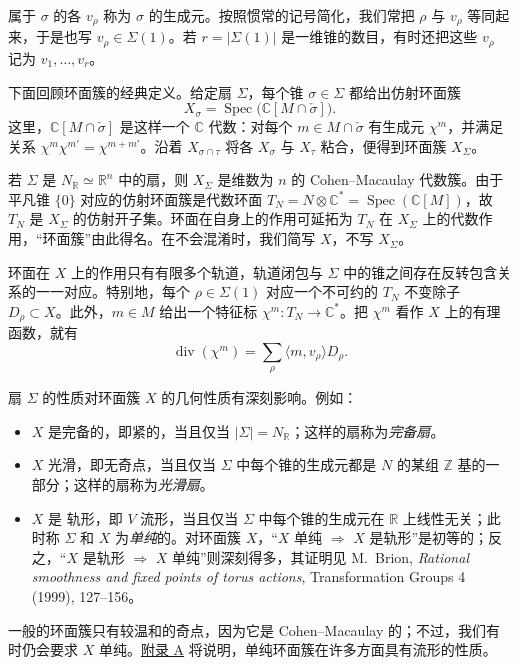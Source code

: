 属于 $\sigma$ 的各 $v_\rho$ 称为 $\sigma$ 的生成元。按照惯常的记号简化，我们常把 $\rho$ 与 $v_\rho$ 等同起来，于是也写 $v_\rho\in\Sigma(1)$。若 $r=|\Sigma(1)|$ 是一维锥的数目，有时还把这些 $v_\rho$ 记为 $v_1,\ldots,v_r$。

下面回顾环面簇的经典定义。给定扇 $\Sigma$，每个锥 $\sigma\in\Sigma$ 都给出仿射环面簇
\[
X_\sigma=\operatorname{Spec}\bigl(\mathbb C[M\cap\check\sigma]\bigr).
\]
这里，$\mathbb C[M\cap\check\sigma]$ 是这样一个 $\mathbb C$ 代数：对每个 $m\in M\cap\check\sigma$ 有生成元 $\chi^m$，并满足关系 $\chi^m\chi^{m'}=\chi^{m+m'}$。沿着 $X_{\sigma\cap\tau}$ 将各 $X_\sigma$ 与 $X_\tau$ 粘合，便得到环面簇 $X_\Sigma$。

若 $\Sigma$ 是 $N_{\mathbb R}\simeq\mathbb R^n$ 中的扇，则 $X_\Sigma$ 是维数为 $n$ 的 Cohen--Macaulay 代数簇。由于平凡锥 $\{0\}$ 对应的仿射环面簇是代数环面 $T_N=N\otimes\mathbb C^*=\operatorname{Spec}(\mathbb C[M])$，故 $T_N$ 是 $X_\Sigma$ 的仿射开子集。环面在自身上的作用可延拓为 $T_N$ 在 $X_\Sigma$ 上的代数作用，“环面簇”由此得名。在不会混淆时，我们简写 $X$，不写 $X_\Sigma$。

环面在 $X$ 上的作用只有有限多个轨道，轨道闭包与 $\Sigma$ 中的锥之间存在反转包含关系的一一对应。特别地，每个 $\rho\in\Sigma(1)$ 对应一个不可约的 $T_N$ 不变除子 $D_\rho\subset X$。此外，$m\in M$ 给出一个特征标 $\chi^m:T_N\to\mathbb C^*$。把 $\chi^m$ 看作 $X$ 上的有理函数，就有
\begin{equation}\label{eq:toric-principal-divisor}
\operatorname{div}(\chi^m)=\sum_\rho\langle m,v_\rho\rangle D_\rho .
\end{equation}

扇 $\Sigma$ 的性质对环面簇 $X$ 的几何性质有深刻影响。例如：
\begin{itemize}
\item $X$ 是完备的，即紧的，当且仅当 $|\Sigma|=N_{\mathbb R}$；这样的扇称为\emph{完备扇}。
\item $X$ 光滑，即无奇点，当且仅当 $\Sigma$ 中每个锥的生成元都是 $N$ 的某组 $\mathbb Z$ 基的一部分；这样的扇称为\emph{光滑扇}。
\item $X$ 是 轨形，即 $V$ 流形，当且仅当 $\Sigma$ 中每个锥的生成元在 $\mathbb R$ 上线性无关；此时称 $\Sigma$ 和 $X$ 为\emph{单纯}的。对环面簇 $X$，“$X$ 单纯 $\Rightarrow$ $X$ 是轨形”是初等的；反之，“$X$ 是轨形 $\Rightarrow$ $X$ 单纯”则深刻得多，其证明见 M.~Brion, \emph{Rational smoothness and fixed points of torus actions}, Transformation Groups 4 (1999), 127--156。
\end{itemize}
一般的环面簇只有较温和的奇点，因为它是 Cohen--Macaulay 的；不过，我们有时仍会要求 $X$ 单纯。\hyperref[app:singular-varieties]{附录 A} 将说明，单纯环面簇在许多方面具有流形的性质。

